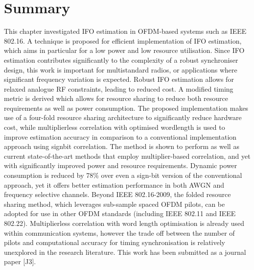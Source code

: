 \section{Summary}

This chapter investigated IFO estimation in OFDM-based systems such as IEEE 802.16. A technique is proposed for efficient implementation of IFO estimation, which aims in particular for a low power and low resource utilisation. 
Since IFO estimation contributes significantly to the complexity of a robust synchroniser design, this work is important for multistandard radios, or applications where significant frequency variation is expected. Robust IFO estimation allows for relaxed analogue RF constraints, leading to reduced cost. A modified timing metric is derived which allows for resource sharing to reduce both resource requirements as well as power consumption. The proposed implementation makes use of a four-fold resource sharing architecture to significantly reduce hardware cost, while multiplierless correlation with optimised wordlength is used to improve estimation accuracy in comparison to a conventional implementation approach using signbit correlation. 
The method is shown to perform as well as current state-of-the-art methods that employ multiplier-based correlation, and yet with significantly improved power and resource requirements. Dynamic power consumption is reduced by 78\% over even a sign-bit version of the conventional approach, yet it offers better estimation performance in both AWGN and frequency selective channels.
Beyond IEEE 802.16-2009, the folded resource sharing method, which leverages sub-sample spaced OFDM pilots, can be adopted for use in other OFDM standards (including IEEE 802.11 and IEEE 802.22). Multiplierless correlation with word length optimisation is already used within communication systems, however the trade off between the number of pilots and computational accuracy for timing synchronisation is relatively unexplored in the research literature. This work has been submitted as a journal paper [J3].